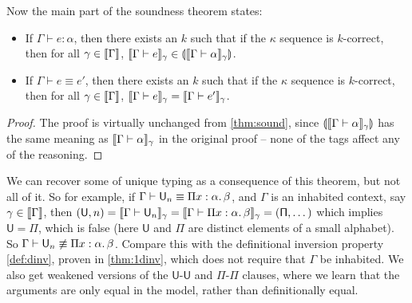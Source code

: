 Now the main part of the soundness theorem states:
\begin{theorem}[Soundness]\label{thm:sound2}
\begin{itemize}
\item If $\Gamma\vdash e:\alpha$, then there exists an $k$ such that if the $\kappa$ sequence is $k$-correct, then for all $\gamma\in\scott{\Gamma}$, $\scott{\Gamma\vdash e}_\gamma\in \ttag{\scott{\Gamma\vdash \alpha}_\gamma}$.
\item If $\Gamma\vdash e\equiv e'$, then there exists an $k$ such that if the $\kappa$ sequence is $k$-correct, then for all $\gamma\in\scott{\Gamma}$, $\scott{\Gamma\vdash e}_\gamma=\scott{\Gamma\vdash e'}_\gamma$.
\end{itemize}
\end{theorem}
\begin{proof}
The proof is virtually unchanged from \autoref{thm:sound}, since $\ttag{\scott{\Gamma\vdash \alpha}_\gamma}$ has the same meaning as $\scott{\Gamma\vdash \alpha}_\gamma$ in the original proof -- none of the tags affect any of the reasoning.
\end{proof}

We can recover some of unique typing as a consequence of this theorem, but not all of it. So for example, if $\Gamma\vdash\U_n\equiv\Pi x:\alpha.\,\beta$, and $\Gamma$ is an inhabited context, say $\gamma\in\scott{\Gamma}$, then $(\mathsf{U},n)=\scott{\Gamma\vdash \U_n}_\gamma=\scott{\Gamma\vdash \Pi x:\alpha.\,\beta}_\gamma=(\mathsf{\Pi},\dots)$ which implies $\mathsf{U}=\mathsf{\Pi}$, which is false (here $\mathsf{U}$ and $\mathsf{\Pi}$ are distinct elements of a small alphabet). So $\Gamma\vdash\U_n\not\equiv\Pi x:\alpha.\,\beta$. Compare this with the definitional inversion property \autoref{def:dinv}, proven in \autoref{thm:1dinv}, which does not require that $\Gamma$ be inhabited. We also get weakened versions of the $\mathsf{U}$-$\mathsf{U}$ and $\mathsf{\Pi}$-$\mathsf{\Pi}$ clauses, where we learn that the arguments are only equal in the model, rather than definitionally equal.


